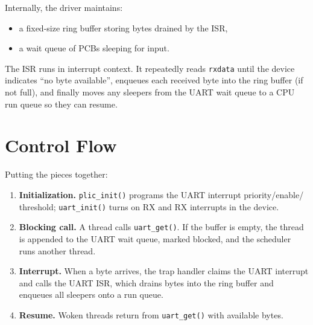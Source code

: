 Internally, the driver maintains:
\begin{itemize}
  \item a fixed-size ring buffer storing bytes drained by the ISR,
  \item a wait queue of PCBs sleeping for input.
\end{itemize}

The ISR runs in interrupt context. It repeatedly reads \texttt{rxdata} until the device indicates
“no byte available”, enqueues each received byte into the ring buffer (if not full), and finally
moves any sleepers from the UART wait queue to a CPU run queue so they can resume.

\begin{figure}[H]
\centering

\end{figure}

\begin{figure}[H]
\centering

\end{figure}

\section{Control Flow}

Putting the pieces together:
\begin{enumerate}
  \item \textbf{Initialization.} \texttt{plic\_init()} programs the UART interrupt priority/enable/
        threshold; \texttt{uart\_init()} turns on RX and RX interrupts in the device.
  \item \textbf{Blocking call.} A thread calls \texttt{uart\_get()}. If the buffer is empty, the
        thread is appended to the UART wait queue, marked blocked, and the scheduler runs another
        thread.
  \item \textbf{Interrupt.} When a byte arrives, the trap handler claims the UART interrupt and
        calls the UART ISR, which drains bytes into the ring buffer and enqueues all sleepers onto
        a run queue.
  \item \textbf{Resume.} Woken threads return from \texttt{uart\_get()} with available bytes.
\end{enumerate}

